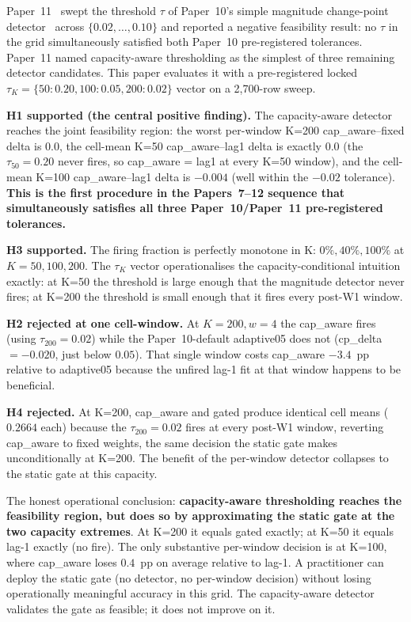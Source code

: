 Paper~11~\cite{paper11tau} swept the threshold $\tau$ of Paper~10's
simple magnitude change-point detector~\cite{paper10adaptive} across
$\{0.02, \ldots, 0.10\}$ and reported a negative feasibility result:
no $\tau$ in the grid simultaneously satisfied both Paper~10
pre-registered tolerances. Paper~11 named capacity-aware thresholding
as the simplest of three remaining detector candidates. This paper
evaluates it with a pre-registered locked $\tau_K = \{50: 0.20,
100: 0.05, 200: 0.02\}$ vector on a 2{,}700-row sweep.

\textbf{H1 supported (the central positive finding).} The capacity-aware
detector reaches the joint feasibility region: the worst per-window
K=200 cap\_aware--fixed delta is $0.0$, the cell-mean K=50
cap\_aware--lag1 delta is exactly $0.0$ (the $\tau_{50}=0.20$ never
fires, so cap\_aware = lag1 at every K=50 window), and the cell-mean
K=100 cap\_aware--lag1 delta is $-0.004$ (well within the $-0.02$
tolerance). \textbf{This is the first procedure in the Papers~7--12
sequence that simultaneously satisfies all three Paper~10/Paper~11
pre-registered tolerances.}

\textbf{H3 supported.} The firing fraction is perfectly monotone in
K: $0\%, 40\%, 100\%$ at $K = 50, 100, 200$. The $\tau_K$ vector
operationalises the capacity-conditional intuition exactly: at K=50
the threshold is large enough that the magnitude detector never fires;
at K=200 the threshold is small enough that it fires every post-W1
window.

\textbf{H2 rejected at one cell-window.} At $K=200, w=4$ the
cap\_aware fires (using $\tau_{200}=0.02$) while the
Paper~10-default adaptive05 does not (cp\_delta $= -0.020$, just
below $0.05$). That single window costs cap\_aware $-3.4$~pp
relative to adaptive05 because the unfired lag-1 fit at that window
happens to be beneficial.

\textbf{H4 rejected.} At K=200, cap\_aware and gated produce
identical cell means ($0.2664$ each) because the
$\tau_{200}=0.02$ fires at every post-W1 window, reverting cap\_aware
to fixed weights, the same decision the static gate makes
unconditionally at K=200. The benefit of the per-window detector
collapses to the static gate at this capacity.

The honest operational conclusion: \textbf{capacity-aware thresholding
reaches the feasibility region, but does so by approximating the
static gate at the two capacity extremes}. At K=200 it equals gated
exactly; at K=50 it equals lag-1 exactly (no fire). The only
substantive per-window decision is at K=100, where cap\_aware loses
$0.4$~pp on average relative to lag-1. A practitioner can deploy
the static gate (no detector, no per-window decision) without losing
operationally meaningful accuracy in this grid. The capacity-aware
detector validates the gate as feasible; it does not improve on it.
